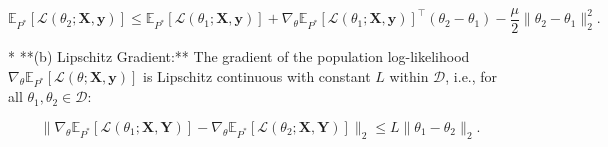 \begin{theorem}
    $$
    \mathbb{E}_{P^*}[\mathcal{L}(\theta_2; \mathbf{X}, \mathbf{y})] \leq \mathbb{E}_{P^*}[\mathcal{L}(\theta_1; \mathbf{X}, \mathbf{y})] + \nabla_\theta \mathbb{E}_{P^*}[\mathcal{L}(\theta_1; \mathbf{X}, \mathbf{y})]^\top (\theta_2 - \theta_1) - \frac{\mu}{2} \| \theta_2 - \theta_1 \|_2^2.
    $$

*   **(b) Lipschitz Gradient:** The gradient of the population log-likelihood $\nabla_\theta \mathbb{E}_{P^*}[\mathcal{L}(\theta; \mathbf{X}, \mathbf{y})]$ is Lipschitz continuous with constant $L$ within $\mathcal{D}$, i.e., for all $\theta_1, \theta_2 \in \mathcal{D}$:

    $$
    \| \nabla_\theta \mathbb{E}_{P^*}[\mathcal{L}(\theta_1; \mathbf{X}, \mathbf{Y})] - \nabla_\theta \mathbb{E}_{P^*}[\mathcal{L}(\theta_2; \mathbf{X}, \mathbf{Y})] \|_2 \leq L \| \theta_1 - \theta_2 \|_2.
    $$
\end{theorem}

